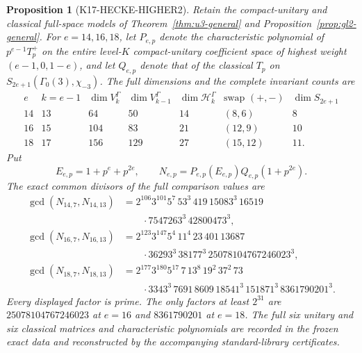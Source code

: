 \documentclass[11pt,a4paper]{article}
\newtheorem{proposition}[theorem]{Proposition}
\theoremstyle{definition}
\begin{document}
\begin{proposition}[K17-HECKE-HIGHER2]\label{prop:hecke-higher2}
Retain the compact-unitary and classical full-space models of
Theorem~\ref{thm:u3-general} and Proposition~\ref{prop:gl2-general}.
For \(e=14,16,18\), let \(P_{e,p}\) denote the characteristic polynomial
of \(p^{e-1}T_p^+\) on the entire level-\(K\) compact-unitary coefficient
space of highest weight \((e-1,0,1-e)\), and let \(Q_{e,p}\) denote that
of the classical \(T_p\) on
\(S_{2e+1}(\Gamma_0(3),\chi_{-3})\).
The full dimensions and the complete invariant counts are
\[
\begin{array}{c|c|r|r|r|c|r}
e&k=e-1&\dim V_k^\Gamma&\dim V_{k-1}^\Gamma&
\dim\mathcal H_k^\Gamma&\text{swap }(+,-)&\dim S_{2e+1}\\ \hline
14&13&64&50&14&(8,6)&8\\
16&15&104&83&21&(12,9)&10\\
18&17&156&129&27&(15,12)&11.
\end{array}
\tag{HH.1}
\]
Put
\[
 E_{e,p}=1+p^e+p^{2e},\qquad
 N_{e,p}=P_{e,p}(E_{e,p})Q_{e,p}(1+p^{2e}).
\]
The exact common divisors of the full comparison values are
\[
\begin{aligned}
\gcd(N_{14,7},N_{14,13})
 &=2^{106}3^{101}5^7\,53^3\,419\,15083^3\,16519\\
 &\qquad{}\cdot7547263^3\,42800473^3,\\
\gcd(N_{16,7},N_{16,13})
 &=2^{123}3^{147}5^4\,11^4\,23\,401\,13687\\
 &\qquad{}\cdot36293^3\,38177^3\,25078104767246023^3,\\
\gcd(N_{18,7},N_{18,13})
 &=2^{177}3^{180}5^{17}\,7\,13^8\,19^2\,37^2\,73\\
 &\qquad{}\cdot3343^3\,7691\,8609\,18541^3
                 \,151871^3\,8361790201^3.
\end{aligned}
\tag{HH.2}
\]
Every displayed factor is prime. The only factors at least \(2^{31}\)
are \(25078104767246023\) at \(e=16\) and \(8361790201\) at \(e=18\).
The full six unitary and six classical matrices and characteristic
polynomials are recorded in the frozen exact data and reconstructed
by the accompanying standard-library certificates.
\end{proposition}
\end{document}
